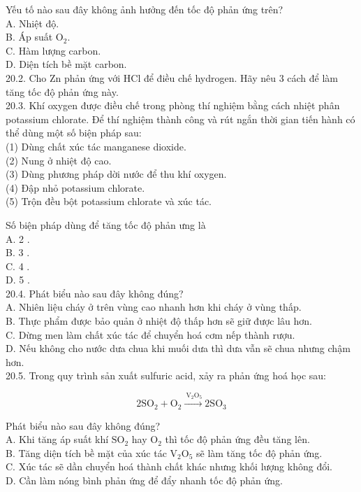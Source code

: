 \documentclass[10pt]{article}
\begin{document}
Yếu tố nào sau đây không ảnh hưởng đến tốc độ phản ứng trên?\\
A. Nhiệt độ.\\
B. Áp suất $\mathrm{O}_{2}$.\\
C. Hàm lượng carbon.\\
D. Diện tích bề mặt carbon.\\
20.2. Cho Zn phản ứng với HCl để điều chế hydrogen. Hãy nêu 3 cách để làm tăng tốc độ phản ứng này.\\
20.3. Khí oxygen được điều chế trong phòng thí nghiệm bằng cách nhiệt phân potassium chlorate. Để thí nghiệm thành công và rút ngắn thời gian tiến hành có thể dùng một số biện pháp sau:\\
(1) Dùng chất xúc tác manganese dioxide.\\
(2) Nung ở nhiệt độ cao.\\
(3) Dùng phương pháp dời nước để thu khí oxygen.\\
(4) Đập nhỏ potassium chlorate.\\
(5) Trộn đều bột potassium chlorate và xúc tác.

Số biện pháp dùng để tăng tốc độ phản ưng là\\
A. 2 .\\
B. 3 .\\
C. 4 .\\
D. 5 .\\
20.4. Phát biểu nào sau đây không đúng?\\
A. Nhiên liệu cháy ở trên vùng cao nhanh hơn khi cháy ở vùng thấp.\\
B. Thực phẩm được bảo quản ở nhiệt độ thấp hơn sẽ giữ được lâu hơn.\\
C. Dừng men làm chất xúc tác để chuyển hoá cơm nếp thành rượu.\\
D. Nếu không cho nước dưa chua khi muối dưa thì dưa vẫn sẽ chua nhưng chậm hơn.\\
20.5. Trong quy trình sản xuất sulfuric acid, xảy ra phản ứng hoá học sau:

$$
2 \mathrm{SO}_{2}+\mathrm{O}_{2} \xrightarrow{\mathrm{~V}_{2} \mathrm{O}_{5}} 2 \mathrm{SO}_{3}
$$

Phát biểu nào sau đây không đúng?\\
A. Khi tăng áp suất khí $\mathrm{SO}_{2}$ hay $\mathrm{O}_{2}$ thì tốc độ phản ứng đều tăng lên.\\
B. Tăng diện tích bề mặt của xúc tác $\mathrm{V}_{2} \mathrm{O}_{5}$ sẽ làm tăng tốc độ phản ứng.\\
C. Xúc tác sẽ dần chuyển hoá thành chất khác nhưng khối lượng không đổi.\\
D. Cần làm nóng bình phản ứng để đẩy nhanh tốc độ phản ứng.
\end{document}
